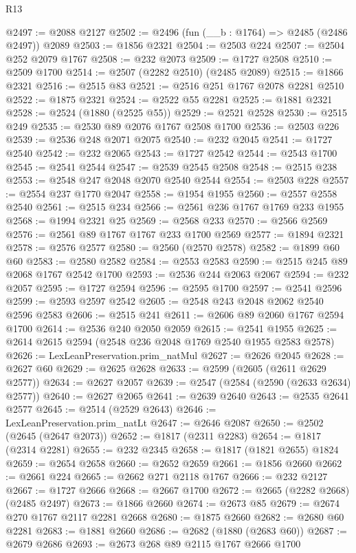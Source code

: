 \begin{lexlean}{R13}
\begin{coremodule}
@2497 := @2088 @2127
@2502 := @2496 (fun (__b : @1764) => @2485 (@2486 @2497)) @2089
@2503 := @1856 @2321
@2504 := @2503 @224
@2507 := @2504 @252 @2079 @1767
@2508 := @232 @2073
@2509 := @1727 @2508
@2510 := @2509 @1700
@2514 := @2507 (@2282 @2510) (@2485 @2089)
@2515 := @1866 @2321
@2516 := @2515 @83
@2521 := @2516 @251 @1767 @2078 @2281 @2510
@2522 := @1875 @2321
@2524 := @2522 @55 @2281
@2525 := @1881 @2321
@2528 := @2524 (@1880 (@2525 @55))
@2529 := @2521 @2528
@2530 := @2515 @249
@2535 := @2530 @89 @2076 @1767 @2508 @1700
@2536 := @2503 @226
@2539 := @2536 @248 @2071 @2075
@2540 := @232 @2045
@2541 := @1727 @2540
@2542 := @232 @2065
@2543 := @1727 @2542
@2544 := @2543 @1700
@2545 := @2541 @2544
@2547 := @2539 @2545 @2508
@2548 := @2515 @238
@2553 := @2548 @247 @2048 @2070 @2540 @2544
@2554 := @2503 @228
@2557 := @2554 @237 @1770 @2047
@2558 := @1954 @1955
@2560 := @2557 @2558 @2540
@2561 := @2515 @234
@2566 := @2561 @236 @1767 @1769 @233 @1955
@2568 := @1994 @2321 @25
@2569 := @2568 @233
@2570 := @2566 @2569
@2576 := @2561 @89 @1767 @1767 @233 @1700 @2569
@2577 := @1894 @2321
@2578 := @2576 @2577
@2580 := @2560 (@2570 @2578)
@2582 := @1899 @60 @60
@2583 := @2580 @2582
@2584 := @2553 @2583
@2590 := @2515 @245 @89 @2068 @1767 @2542 @1700
@2593 := @2536 @244 @2063 @2067
@2594 := @232 @2057
@2595 := @1727 @2594
@2596 := @2595 @1700
@2597 := @2541 @2596
@2599 := @2593 @2597 @2542
@2605 := @2548 @243 @2048 @2062 @2540 @2596 @2583
@2606 := @2515 @241
@2611 := @2606 @89 @2060 @1767 @2594 @1700
@2614 := @2536 @240 @2050 @2059
@2615 := @2541 @1955
@2625 := @2614 @2615 @2594 (@2548 @236 @2048 @1769 @2540 @1955 @2583 @2578)
@2626 := LexLeanPreservation.prim_natMul
@2627 := @2626 @2045
@2628 := @2627 @60
@2629 := @2625 @2628
@2633 := @2599 (@2605 (@2611 @2629 @2577))
@2634 := @2627 @2057
@2639 := @2547 (@2584 (@2590 (@2633 @2634) @2577))
@2640 := @2627 @2065
@2641 := @2639 @2640
@2643 := @2535 @2641 @2577
@2645 := @2514 (@2529 @2643)
@2646 := LexLeanPreservation.prim_natLt
@2647 := @2646 @2087
@2650 := @2502 (@2645 (@2647 @2073))
@2652 := @1817 (@2311 @2283)
@2654 := @1817 (@2314 @2281)
@2655 := @232 @2345
@2658 := @1817 (@1821 @2655) @1824
@2659 := @2654 @2658
@2660 := @2652 @2659
@2661 := @1856 @2660
@2662 := @2661 @224
@2665 := @2662 @271 @2118 @1767
@2666 := @232 @2127
@2667 := @1727 @2666
@2668 := @2667 @1700
@2672 := @2665 (@2282 @2668) (@2485 @2497)
@2673 := @1866 @2660
@2674 := @2673 @85
@2679 := @2674 @270 @1767 @2117 @2281 @2668
@2680 := @1875 @2660
@2682 := @2680 @60 @2281
@2683 := @1881 @2660
@2686 := @2682 (@1880 (@2683 @60))
@2687 := @2679 @2686
@2693 := @2673 @268 @89 @2115 @1767 @2666 @1700

\end{coremodule}
\end{lexlean}
